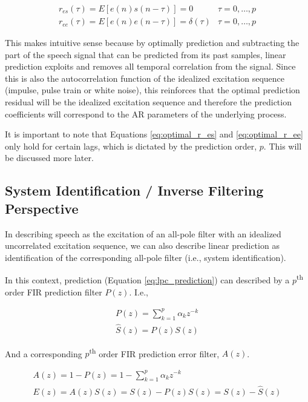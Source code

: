 \begin{eqnarray}
	r_{es}(\tau) = E\left[e(n)s(n-\tau)\right] = 0 & \tau=0,\dots,p \label{eq:optimal_r_es} \\
	r_{ee}(\tau) = E\left[e(n)e(n-\tau)\right]=\delta(\tau)  & \tau=0,\dots,p  \label{eq:optimal_r_ee}
\end{eqnarray}

This makes intuitive sense because by optimally prediction and subtracting the part of the speech signal that can be predicted from its past samples, linear prediction exploits and removes all temporal correlation from the signal. Since this is also the autocorrelation function of the idealized excitation sequence (impulse, pulse train or white noise), this reinforces that the optimal prediction residual will be the idealized excitation sequence and therefore the prediction coefficients will correspond to the AR parameters of the underlying process.

It is important to note that Equations  \ref{eq:optimal_r_es} and \ref{eq:optimal_r_ee} only hold for certain lags, which is dictated by the prediction order, $p$. This will be discussed more later.


\subsection{System Identification / Inverse Filtering Perspective} \label{lp_inverse_filtering_perspective}

In describing speech as the excitation of an all-pole filter with an idealized uncorrelated excitation sequence, we can also describe linear prediction as identification of the corresponding all-pole filter (i.e., system identification). 

In this context, prediction (Equation \ref{eq:lpc_prediction}) can described by a $p$\textsuperscript{th} order FIR prediction filter $P(z)$. I.e.,

\begin{eqnarray}
	P(z) = \sum_{k=1}^{p}\alpha_k z^{-k} \\
	\hat{S}(z) = P(z)S(z)
\end{eqnarray}

\noindent
And a corresponding $p$\textsuperscript{th} order FIR prediction error filter, $A(z)$.

\begin{eqnarray}
	A(z) = 1 - P(z) = 1 - \sum_{k=1}^{p}\alpha_k z^{-k} \\
	E(z) = A(z)S(z) = S(z) - P(z)S(z) = S(z) - \hat{S}(z)
\end{eqnarray}

